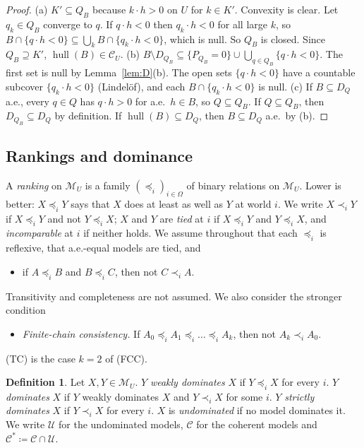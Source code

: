 \documentclass[11pt]{article}
\newcommand{\M}{\mathcal{M}}
\newcommand{\CC}{\mathcal{C}}
\newcommand{\UU}{\mathcal{U}}
\newcommand{\hull}{\operatorname{hull}}
\theoremstyle{plain}
\theoremstyle{definition}
\newtheorem{definition}[theorem]{Definition}
\theoremstyle{remark}
\begin{document}
\begin{proof}
(a) $K'\subseteq Q_B$ because $k\cdot h>0$ on $U$ for $k\in K'$. Convexity is clear. Let
$q_k\in Q_B$ converge to $q$. If $q\cdot h<0$ then $q_k\cdot h<0$ for all large $k$, so
$B\cap\{q\cdot h<0\}\subseteq\bigcup_kB\cap\{q_k\cdot h<0\}$, which is null. So $Q_B$ is
closed. Since $Q_B\supseteq K'$, $\hull(B)\in\CC_U$.
(b) $B\setminus D_{Q_B}\subseteq\{P_{Q_B}=0\}\cup\bigcup_{q\in Q_B}\{q\cdot h<0\}$. The
first set is null by Lemma~\ref{lem:D}(b). The open sets $\{q\cdot h<0\}$ have a countable
subcover $\{q_k\cdot h<0\}$ (Lindel\"of), and each $B\cap\{q_k\cdot h<0\}$ is null.
(c) If $B\subseteq D_Q$ a.e., every $q\in Q$ has $q\cdot h>0$ for a.e.\ $h\in B$, so
$Q\subseteq Q_B$. If $Q\subseteq Q_B$, then $D_{Q_B}\subseteq D_Q$ by definition. If
$\hull(B)\subseteq D_Q$, then $B\subseteq D_Q$ a.e.\ by (b).
\end{proof}

\subsection{Rankings and dominance}

A \emph{ranking} on $\M_U$ is a family $(\preceq_i)_{i\in\Omega}$ of binary relations on
$\M_U$. Lower is better: $X\preceq_iY$ says that $X$ does at least as well as $Y$ at
world $i$. We write $X\prec_iY$ if $X\preceq_iY$ and not $Y\preceq_iX$; $X$ and $Y$ are
\emph{tied} at $i$ if $X\preceq_iY$ and $Y\preceq_iX$, and \emph{incomparable} at $i$ if
neither holds. We assume throughout that each $\preceq_i$ is reflexive, that a.e.-equal
models are tied, and
\begin{itemize}
  \item[(TC)] if $A\preceq_iB$ and $B\preceq_iC$, then not $C\prec_iA$.
\end{itemize}
Transitivity and completeness are not assumed. We also consider the stronger condition
\begin{itemize}
  \item[(FCC)] \emph{Finite-chain consistency.} If $A_0\preceq_iA_1\preceq_i\dots
  \preceq_iA_k$, then not $A_k\prec_iA_0$.
\end{itemize}
(TC) is the case $k=2$ of (FCC).

\begin{definition}\label{def:dom}
Let $X,Y\in\M_U$. $Y$ \emph{weakly dominates} $X$ if $Y\preceq_iX$ for every $i$. $Y$
\emph{dominates} $X$ if $Y$ weakly dominates $X$ and $Y\prec_iX$ for some $i$. $Y$
\emph{strictly dominates} $X$ if $Y\prec_iX$ for every $i$. $X$ is \emph{undominated} if
no model dominates it. We write $\UU$ for the undominated models, $\CC$ for the coherent
models and $\CC^\ast\coloneqq\CC\cap\UU$.
\end{definition}
\end{document}

